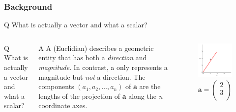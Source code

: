 \documentclass{beamer}
\begin{document}
\begin{frame}
\frametitle{Background}
\begin{block}{Q}
What is actually a vector and what a scalar?
\end{block}
\end{frame}

\begin{frame}
\begin{columns}[c]
\begin{block}{Q}
What is actually a vector and what a scalar?
\end{block}

\begin{block}{A}
A (Euclidian) {} describes a geometric entity that has both a \emph{direction} and \emph{magnitude}. 
In contrast, a {}  only represents a magnitude but \emph{not} a direction. The components $( a_1, a_2, \ldots, a_n)$ of \textbf{a} are the lengths of the projection of 
 \textbf{a} along the \emph{n} coordinate axes.
\end{block}

\begin{figure}[htbp]
\begin{center}
 \includegraphics[width=\textwidth]{figure1.png}
\caption{
	$\mathbf{a} = \left(
	\begin{array}{c}
	2\\
	3\\
	\end{array}
	\right)$}

\label{Geometry}
\end{center}
\end{figure}
\end{columns}
\end{frame}
\end{document}
